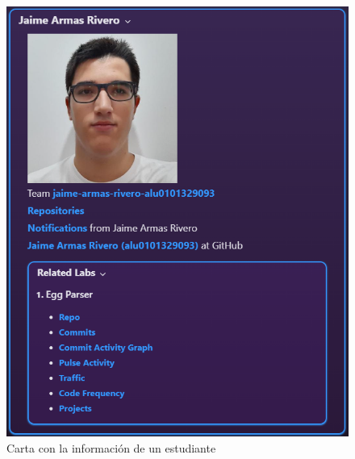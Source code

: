 \begin{figure}
    \centering
    \includegraphics{images/userInfoCard.png}
    \caption{Carta con la información de un estudiante}
    \label{fig:userInfoCard}
\end{figure}